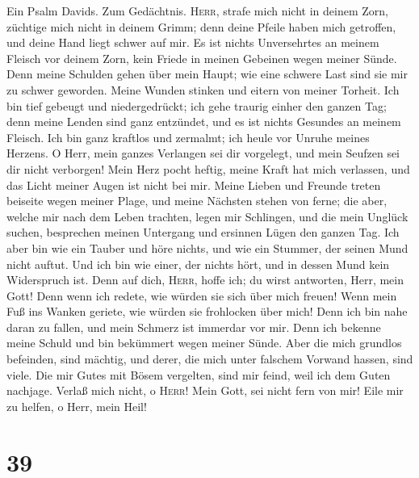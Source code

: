  Ein Psalm Davids. Zum Gedächtnis. \textsc{Herr}, strafe
mich nicht in deinem Zorn, züchtige mich nicht in deinem Grimm;
 denn deine Pfeile haben mich getroffen, und deine Hand
liegt schwer auf mir.  Es ist nichts Unversehrtes an
meinem Fleisch vor deinem Zorn, kein Friede in meinen Gebeinen wegen
meiner Sünde.  Denn meine Schulden gehen über mein Haupt;
wie eine schwere Last sind sie mir zu schwer geworden. 
Meine Wunden stinken und eitern von meiner Torheit.  Ich
bin tief gebeugt und niedergedrückt; ich gehe traurig einher den ganzen
Tag;  denn meine Lenden sind ganz entzündet, und es ist
nichts Gesundes an meinem Fleisch.  Ich bin ganz kraftlos
und zermalmt; ich heule vor Unruhe meines Herzens.  O
Herr, mein ganzes Verlangen sei dir vorgelegt, und mein Seufzen sei dir
nicht verborgen!  Mein Herz pocht heftig, meine Kraft hat
mich verlassen, und das Licht meiner Augen ist nicht bei mir.
 Meine Lieben und Freunde treten beiseite wegen meiner
Plage, und meine Nächsten stehen von ferne;  die aber,
welche mir nach dem Leben trachten, legen mir Schlingen, und die mein
Unglück suchen, besprechen meinen Untergang und ersinnen Lügen den
ganzen Tag.  Ich aber bin wie ein Tauber und höre nichts,
und wie ein Stummer, der seinen Mund nicht auftut.  Und
ich bin wie einer, der nichts hört, und in dessen Mund kein Widerspruch
ist.  Denn auf dich, \textsc{Herr}, hoffe ich; du wirst
antworten, Herr, mein Gott!  Denn wenn ich redete, wie
würden sie sich über mich freuen! Wenn mein Fuß ins Wanken geriete, wie
würden sie frohlocken über mich!  Denn ich bin nahe daran
zu fallen, und mein Schmerz ist immerdar vor mir.  Denn
ich bekenne meine Schuld und bin bekümmert wegen meiner Sünde.
 Aber die mich grundlos befeinden, sind mächtig, und
derer, die mich unter falschem Vorwand hassen, sind viele.
 Die mir Gutes mit Bösem vergelten, sind mir feind, weil
ich dem Guten nachjage.  Verlaß mich nicht, o
\textsc{Herr}! Mein Gott, sei nicht fern von mir!  Eile
mir zu helfen, o Herr, mein Heil!

\hypertarget{section-38}{%
\section{39}\label{section-38}}


